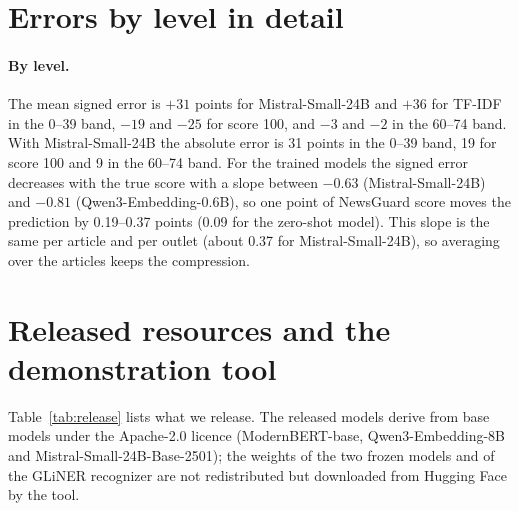 \documentclass[11pt,a4paper]{article}
\begin{document}
\section{Errors by level in detail}\label{app:errors}
\paragraph{By level.} The mean signed error is $+31$ points for Mistral-Small-24B and $+36$ for TF-IDF in the 0--39
band, $-19$ and $-25$ for score 100, and $-3$ and $-2$ in the 60--74 band. With Mistral-Small-24B the absolute error is
31 points in the 0--39 band, 19 for score 100 and 9 in the 60--74 band. For the trained models the signed error
decreases with the true score with a slope between $-0.63$ (Mistral-Small-24B) and $-0.81$ (Qwen3-Embedding-0.6B), so
one point of NewsGuard score moves the prediction by 0.19--0.37 points (0.09 for the zero-shot model). This slope is the
same per article and per outlet (about 0.37 for Mistral-Small-24B), so averaging over the articles keeps the
compression.

\section{Released resources and the demonstration tool}\label{app:tool}
Table~\ref{tab:release} lists what we release. The released models derive from base models under the Apache-2.0 licence
(ModernBERT-base, Qwen3-Embedding-8B and Mistral-Small-24B-Base-2501); the weights of the two frozen models and of the
GLiNER recognizer are not redistributed but downloaded from Hugging Face by the tool.
\end{document}
